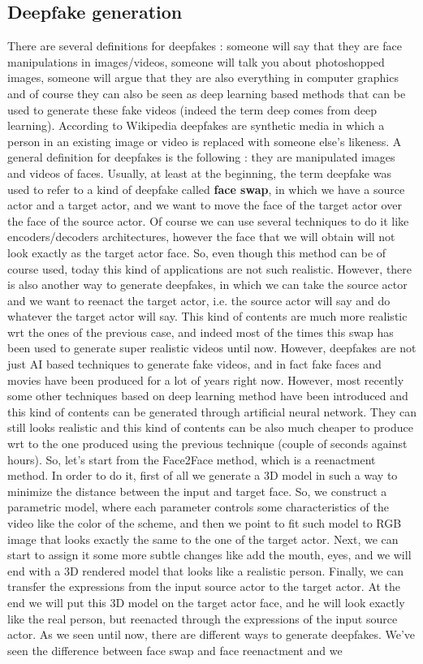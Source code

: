 \documentclass[11pt]{article}
\begin{document}
\subsection{Deepfake generation}
There are several definitions for deepfakes : someone will say that they are face manipulations in images/videos, someone will talk you about photoshopped images, someone will argue that they are also everything in computer graphics and of course they can also be seen as deep learning based methods that can be used to generate these fake videos (indeed the term deep comes from deep learning). According to Wikipedia deepfakes are synthetic media in which a person in an existing image or video is replaced with someone else's likeness. A general definition for deepfakes is the following : they are manipulated images and videos of faces. Usually, at least at the beginning, the term deepfake was used to refer to a kind of deepfake called \textbf{face swap}, in which we have a source actor and a target actor, and we want to move the face of the target actor over the face of the source actor. Of course we can use several techniques to do it like encoders/decoders architectures, however the face that we will obtain will not look exactly as the target actor face. So, even though this method can be of course used, today this kind of applications are not such realistic. However, there is also another way to generate deepfakes, in which we can take the source actor and we want to reenact the target actor, i.e. the source actor will say and do whatever the target actor will say. This kind of contents are much more realistic wrt the ones of the previous case, and indeed most of the times this swap has been used to generate super realistic videos until now. However, deepfakes are not just AI based techniques to generate fake videos, and in fact fake faces and movies have been produced for a lot of years right now. However, most recently some other techniques based on deep learning method have been introduced and this kind of contents can be generated through artificial neural network. They can still looks realistic and this kind of contents can be also much cheaper to produce wrt to the one produced using the previous technique (couple of seconds against hours). So, let's start from the Face2Face method, which is a reenactment method. In order to do it, first of all we generate a 3D model in such a way to minimize the distance between the input and target face. So, we construct a parametric model, where each parameter controls some characteristics of the video like the color of the scheme, and then we point to fit such model to RGB image that looks exactly the same to the one of the target actor. Next, we can start to assign it some more subtle changes like add the mouth, eyes, and we will end with a 3D rendered model that looks like a realistic person. Finally, we can transfer the expressions from the input source actor to the target actor. At the end we will put this 3D model on the target actor face, and he will look exactly like the real person, but reenacted through the expressions of the input source actor. As we seen until now, there are different ways to generate deepfakes. We've seen the difference between face swap and face reenactment and we 
\end{document}
